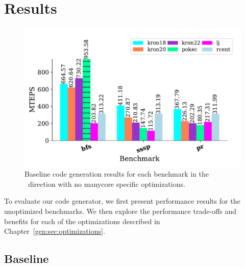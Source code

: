 \section{Results}
\begin{figure}[!ht]
    \centering
    \includegraphics[scale = 0.65]{graphit-figures/baseline.pdf}
    \caption{Baseline code generation results for each benchmark in the \pull~direction with no manycore specific optimizations.}
    \label{pap:generals:sec:eval:fig:baseline}
\end{figure}

To evaluate our code generator, we first present performance results for the unoptimized benchmarks. 
We then explore the performance trade-offs and benefits for each of the optimizations described in Chapter~\ref{gen:sec:optimizations}.

\subsection{Baseline}
 
